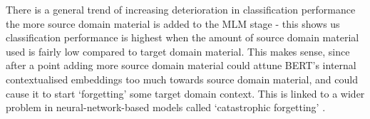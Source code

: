 There is a general trend of increasing deterioration in classification performance the more source domain material is added to the MLM stage - this shows us classification performance is highest when the amount of source domain material used is fairly low compared to target domain material. This makes sense, since after a point adding more source domain material could attune BERT's internal contextualised embeddings too much towards source domain material, and could cause it to start `forgetting' some target domain context. This is linked to a wider problem in neural-network-based models called `catastrophic forgetting' \cite{catastrophic-forgetting}. 